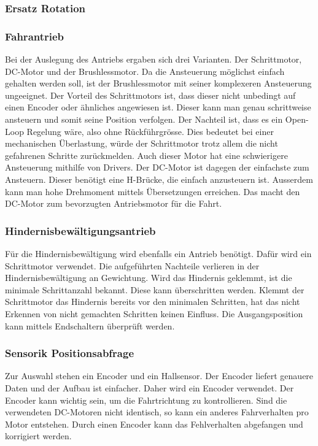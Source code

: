 \documentclass[../main.tex]{subfiles}
\begin{document}
\subsubsection{Ersatz Rotation}

\subsubsection{Fahrantrieb}
Bei der Auslegung des Antriebs ergaben sich drei Varianten. Der Schrittmotor, DC-Motor und der Brushlessmotor. Da die Ansteuerung möglichst einfach gehalten werden soll, ist der Brushlessmotor mit seiner komplexeren Ansteuerung ungeeignet. Der Vorteil des Schrittmotors ist, dass dieser nicht unbedingt auf einen Encoder oder ähnliches angewiesen ist. Dieser kann man genau schrittweise ansteuern und somit seine Position verfolgen. Der Nachteil ist, dass es ein Open-Loop Regelung wäre, also ohne Rückführgrösse. Dies bedeutet bei einer mechanischen Überlastung, würde der Schrittmotor trotz allem die nicht gefahrenen Schritte zurückmelden. Auch dieser Motor hat eine schwierigere Ansteuerung mithilfe von Drivers. Der DC-Motor ist dagegen der einfachste zum Ansteuern. Dieser benötigt eine H-Brücke, die einfach anzusteuern ist. Ausserdem kann man hohe Drehmoment mittels Übersetzungen erreichen. Das macht den DC-Motor zum bevorzugten Antriebsmotor für die Fahrt.


\subsubsection{Hindernisbewältigungsantrieb}
Für die Hindernisbewältigung wird ebenfalls ein Antrieb benötigt. Dafür wird ein Schrittmotor verwendet. Die aufgeführten Nachteile verlieren in der Hindernisbewältigung an Gewichtung. Wird das Hindernis geklemmt, ist die minimale Schrittanzahl bekannt. Diese kann überschritten werden. Klemmt der Schrittmotor das Hindernis bereits vor den minimalen Schritten, hat das nicht Erkennen von nicht gemachten Schritten keinen Einfluss. Die Ausgangsposition kann mittels Endschaltern überprüft werden.
  

\subsubsection{Sensorik Positionsabfrage}
Zur Auswahl stehen ein Encoder und ein Hallsensor. Der Encoder liefert genauere Daten und der Aufbau ist einfacher. Daher wird ein Encoder verwendet. Der Encoder kann wichtig sein, um die Fahrtrichtung zu kontrollieren. Sind die verwendeten DC-Motoren nicht identisch, so kann ein anderes Fahrverhalten pro Motor entstehen. Durch einen Encoder kann das Fehlverhalten abgefangen und korrigiert werden. 
\end{document}
